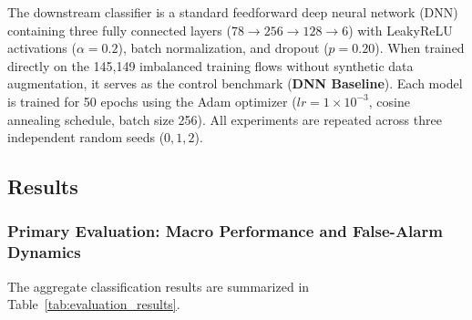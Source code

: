 \documentclass[conference]{IEEEtran}
\begin{document}
The downstream classifier is a standard feedforward deep neural network (DNN)~\cite{lecun2015deeplearning} containing three fully connected layers ($78 \to 256 \to 128 \to 6$) with LeakyReLU activations ($\alpha = 0.2$), batch normalization, and dropout ($p = 0.20$). When trained directly on the 145,149 imbalanced training flows without synthetic data augmentation, it serves as the control benchmark (\textbf{DNN Baseline}). Each model is trained for 50 epochs using the Adam optimizer ($lr = 1 \times 10^{-3}$, cosine annealing schedule, batch size 256). All experiments are repeated across three independent random seeds ($0, 1, 2$).

\subsection{Results}

\subsubsection{Primary Evaluation: Macro Performance and False-Alarm Dynamics}

The aggregate classification results are summarized in Table~\ref{tab:evaluation_results}.

\begin{table}[t]
\centering
\caption{Aggregate Performance on Held-Out CICIDS2017 Test Set (Mean $\pm$ Std across 3 Seeds)}
\label{tab:evaluation_results}
\end{table}
\end{document}
